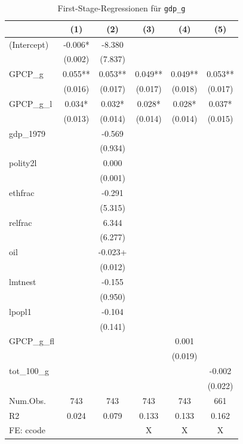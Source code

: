 \documentclass[
  a4paper,
  DIV=11,
  oneside]{scrreprt}
\begin{document}
\setlength{\LTpost}{0mm}

\begin{longtable}{lccccc}

\caption{\label{tbl-blablabla}First-Stage-Regressionen für
\texttt{gdp\_g}}

\tabularnewline

\toprule
  & (1) & (2) & (3) & (4) & (5) \\ 
\midrule\addlinespace[2.5pt]
(Intercept) & -0.006* & -8.380 &  &  &  \\ 
 & (0.002) & (7.837) &  &  &  \\ 
GPCP\_g & 0.055** & 0.053** & 0.049** & 0.049** & 0.053** \\ 
 & (0.016) & (0.017) & (0.017) & (0.018) & (0.017) \\ 
GPCP\_g\_l & 0.034* & 0.032* & 0.028* & 0.028* & 0.037* \\ 
 & (0.013) & (0.014) & (0.014) & (0.014) & (0.015) \\ 
gdp\_1979 &  & -0.569 &  &  &  \\ 
 &  & (0.934) &  &  &  \\ 
polity2l &  & 0.000 &  &  &  \\ 
 &  & (0.001) &  &  &  \\ 
ethfrac &  & -0.291 &  &  &  \\ 
 &  & (5.315) &  &  &  \\ 
relfrac &  & 6.344 &  &  &  \\ 
 &  & (6.277) &  &  &  \\ 
oil &  & -0.023+ &  &  &  \\ 
 &  & (0.012) &  &  &  \\ 
lmtnest &  & -0.155 &  &  &  \\ 
 &  & (0.950) &  &  &  \\ 
lpopl1 &  & -0.104 &  &  &  \\ 
 &  & (0.141) &  &  &  \\ 
GPCP\_g\_fl &  &  &  & 0.001 &  \\ 
 &  &  &  & (0.019) &  \\ 
tot\_100\_g &  &  &  &  & -0.002 \\ 
 &  &  &  &  & (0.022) \\ 
Num.Obs. & 743 & 743 & 743 & 743 & 661 \\ 
R2 & 0.024 & 0.079 & 0.133 & 0.133 & 0.162 \\ 
FE: ccode &  &  & X & X & X \\ 
\bottomrule

\end{longtable}
\end{document}
